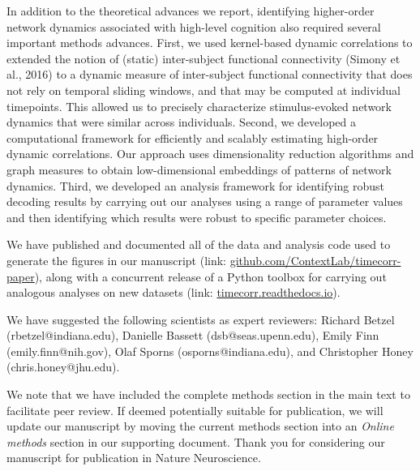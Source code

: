\documentclass[11pt,stdletter,orderfromtodate,sigleft]{newlfm}
\begin{document}
\begin{newlfm}
  In addition to the theoretical advances we report, identifying
  higher-order network dynamics associated with high-level cognition
  also required several important methods advances.  First, we used
  kernel-based dynamic correlations to extended the notion of (static)
  inter-subject functional connectivity (Simony et al., 2016) to a
  dynamic measure of inter-subject functional connectivity that does
  not rely on temporal sliding windows, and that may be computed at
  individual timepoints.  This allowed us to precisely characterize
  stimulus-evoked network dynamics that were similar across
  individuals.  Second, we developed a computational framework for
  efficiently and scalably estimating high-order dynamic correlations.
  Our approach uses dimensionality reduction algorithms and graph
  measures to obtain low-dimensional embeddings of patterns of network
  dynamics.  Third, we developed an analysis framework for identifying
  robust decoding results by carrying out our analyses using a range
  of parameter values and then identifying which results were robust
  to specific parameter choices.

  We have published and documented all of the data and analysis code
  used to generate the figures in our manuscript (link:
  \href{https://github.com/ContextLab/timecorr-paper}{github.com/ContextLab/timecorr-paper}),
  along with a concurrent release of a Python toolbox for carrying out
  analogous analyses on new datasets (link:
  \href{http://timecorr.readthedocs.io}{timecorr.readthedocs.io}).

  We have suggested the following scientists as expert reviewers:
  Richard Betzel (r\-bet\-zel@in\-di\-ana.edu), Danielle Bassett (dsb@seas.upenn.edu), Emily Finn
  (emily.finn@nih.gov), Olaf Sporns (o\-sporns@in\-di\-ana.edu), and Christopher Honey (chris.honey@jhu.edu).

  We note that we have included the complete methods section in the
  main text to facilitate peer review.  If deemed potentially suitable
  for publication, we will update our manuscript by moving the current
  methods section into an \textit{Online methods} section in our
  supporting document.  Thank you for considering our manuscript for
  publication in Nature Neuroscience.

\end{newlfm}
\end{document}
